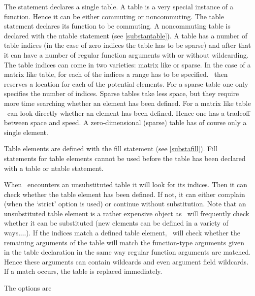 \noindent The statement declares a single table. A table is a 
very special instance of a function. Hence it can be either 
commuting or noncommuting. The table 
statement declares its function to be commuting. A noncommuting table is 
declared with the ntable statement (see \ref{substantable}). 
A table has a number of table indices (in the case of 
zero indices the table has to be sparse) and after that it can have a 
number of regular function arguments with or without wildcarding. The table 
indices can come in two varieties: matrix like or 
sparse. In the case of a matrix like table, for each of the indices a range has to be specified. \FORM\ then 
reserves a location for each of the potential elements. For a sparse 
table one only specifies the number of indices. Sparse 
tables take less space, but they require more time searching whether an 
element has been defined. For a matrix like table \FORM\ can look directly 
whether an element has been defined. Hence one has a tradeoff between space 
and speed. A zero-dimensional (sparse) table has of course only a single 
element.\vspace{4mm}

\noindent Table elements are defined with the fill statement (see 
\ref{substafill}). Fill statements for table elements cannot be used before 
the table has been declared with a table or ntable statement.\vspace{4mm}

\noindent When \FORM\ encounters an unsubstituted table it will look for its 
indices. Then it can check whether the table element has been defined. If 
not, it can either complain (when the `strict' option is 
used) or continue without substitution. Note that an unsubstituted table 
element is a rather expensive object as \FORM\ will frequently check whether 
it can be substituted (new elements can be defined in a variety of 
ways....). If the indices match a defined table element, \FORM\ will check 
whether the remaining arguments of the table will match the function-type 
arguments given in the table declaration in the same way regular function 
arguments are matched. Hence these arguments can contain 
wildcards and even argument field 
wildcards. If a match occurs, the table is replaced immediately.

\noindent The options are

